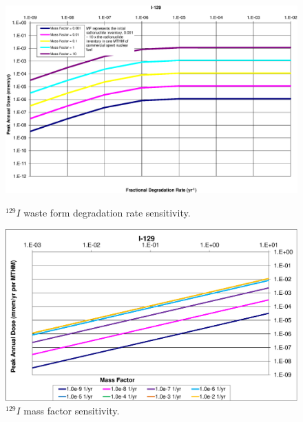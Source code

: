 \begin{figure}[ht!]
\begin{minipage}[b]{0.45\linewidth}
\centering
\includegraphics[width=\linewidth]{./chapters/nuclide_sensitivity/clay/WFDegAndInv/I-129.eps}
\caption{$^{129}I$ waste form degradation rate sensitivity.}
\label{fig:WFDegI129}

\end{minipage}
\hspace{0.05\linewidth}
\begin{minipage}[b]{0.45\linewidth}

\includegraphics[width=\linewidth]{./chapters/nuclide_sensitivity/clay/WFDegAndInv/I-129-MF.eps}
\caption{$^{129}I$ mass factor sensitivity.}
\label{fig:WFDegI129MF}

\end{minipage}
\end{figure}
